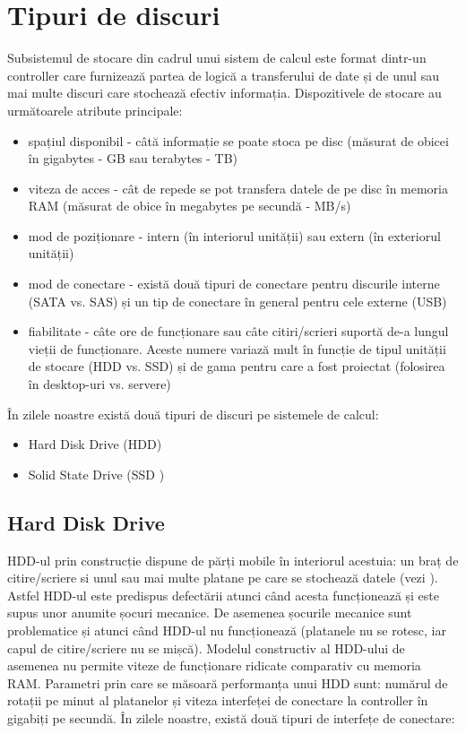 \section{Tipuri de discuri}
\label{sec:storage-tipuri}

Subsistemul de stocare din cadrul unui sistem de calcul este format dintr-un
controller care furnizează partea de logică a transferului de date și de unul
sau mai multe discuri care stochează efectiv informația. Dispozitivele de
stocare au următoarele atribute principale:

\begin{itemize}
	\item spațiul disponibil - câtă informație se poate stoca pe disc
		(măsurat de obicei în gigabytes - GB sau terabytes
		 - TB)
	\item viteza de acces - cât de repede se pot transfera datele de pe disc
		în memoria RAM (măsurat de obice în megabytes pe secundă - MB/s)
	\item mod de poziționare - intern (în interiorul unității) sau extern
		(în exteriorul unității)
	\item mod de conectare - există două tipuri de conectare pentru
		discurile interne (SATA vs. SAS) și un tip de conectare în
		general pentru cele externe (USB)
	\item fiabilitate - câte ore de funcționare sau câte citiri/scrieri
		suportă de-a lungul vieții de funcționare. Aceste numere variază
		mult în funcție de tipul unității de stocare (HDD vs. SSD) și de
		gama pentru care a fost proiectat (folosirea în desktop-uri vs.
		servere)
\end{itemize}

În zilele noastre există două tipuri de discuri pe sistemele de calcul:

\begin{itemize}
	\item Hard Disk Drive (HDD)
	\item Solid State Drive (SSD )
\end{itemize}

\subsection{Hard Disk Drive}
\label{sec:storage-tipuri-hdd}

HDD-ul prin construcție dispune de părți mobile în interiorul acestuia: un braț
de citire/scriere si unul sau mai multe platane pe care se stochează datele
(vezi ). Astfel HDD-ul este predispus defectării atunci când acesta
funcționează și este supus unor anumite șocuri mecanice. De asemenea șocurile
mecanice sunt problematice și atunci când HDD-ul nu funcționează (platanele nu
se rotesc, iar capul de citire/scriere nu se mișcă). Modelul constructiv al
HDD-ului de asemenea nu permite viteze de funcționare ridicate comparativ cu
memoria RAM. Parametri prin care se măsoară performanța unui HDD sunt: numărul
de rotații pe minut al platanelor și viteza interfeței de conectare la
controller în gigabiți pe secundă. În zilele noastre, există două tipuri de
interfețe de conectare:

